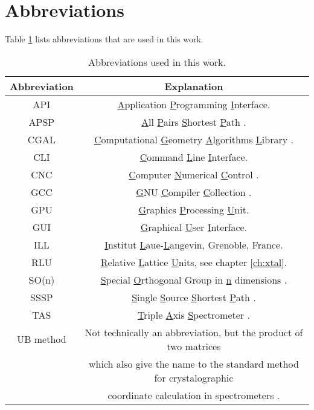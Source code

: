 \section{Abbreviations}
Table \ref{tab:abbreviations} lists abbreviations that are used in this work.

\begin{table}[htb]
	\centering
	\begin{tabular}{|c|c|}
		\hline
		\bf{Abbreviation} & \bf{Explanation} \tabularnewline
		\hline
		API		 & \underline{A}pplication \underline{P}rogramming \underline{I}nterface. \tabularnewline
		\hline
		APSP		 & \underline{A}ll \underline{P}airs \underline{S}hortest \underline{P}ath \cite[pp. 309-320]{Erickson2019}. \tabularnewline
		\hline
		CGAL             & \underline{C}omputational \underline{G}eometry \underline{A}lgorithms \underline{L}ibrary \cite{web_cgal}. \tabularnewline
		\hline
		CLI              & \underline{C}ommand \underline{L}ine \underline{I}nterface. \tabularnewline
		\hline
		CNC              & \underline{C}omputer \underline{N}umerical \underline{C}ontrol \cite{wiki_milling}. \tabularnewline
		\hline
		GCC              & \underline{G}NU \underline{C}ompiler \underline{C}ollection \cite{web_gcc}. \tabularnewline
		\hline
		GPU              & \underline{G}raphics \underline{P}rocessing \underline{U}nit. \tabularnewline
		\hline
		GUI              & \underline{G}raphical \underline{U}ser \underline{I}nterface. \tabularnewline
		\hline
		ILL              & \underline{I}nstitut \underline{L}aue-\underline{L}angevin, Grenoble, France. \tabularnewline
		\hline
		RLU              & \underline{R}elative \underline{L}attice \underline{U}nits, see chapter \ref{ch:xtal}. \tabularnewline
		\hline
		SO(n)            & \underline{S}pecial \underline{O}rthogonal Group in \underline{n} dimensions \cite[pp. 849-851]{Arfken2013}. \tabularnewline
		\hline
		SSSP		 & \underline{S}ingle \underline{S}ource \underline{S}hortest \underline{P}ath \cite[pp. 273-297]{Erickson2019}. \tabularnewline
		\hline
		TAS              & \underline{T}riple \underline{A}xis \underline{S}pectrometer \cite{Shirane2002}. \tabularnewline
		\hline
		UB method        & Not technically an abbreviation, but the product of two matrices \tabularnewline
		                          & which also give the name to the standard method for crystalographic \tabularnewline
		                          & coordinate calculation in spectrometers \cite{Lumsden2005}. \tabularnewline
		\hline
	\end{tabular}
	\caption[Abbreviations.]{Abbreviations used in this work.}
	\label{tab:abbreviations}
\end{table}
